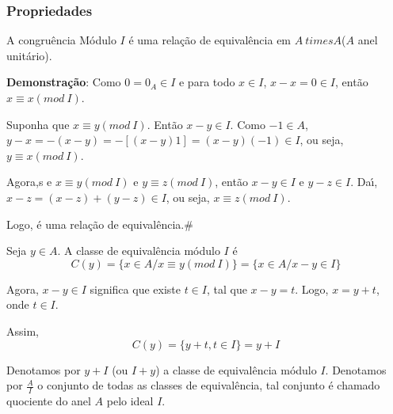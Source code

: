 \subsubsection{Propriedades}
\begin{proposicao} A congru{\^e}ncia M{\'o}dulo $I$ {\'e} uma rela{\c c}{\~a}o de equival{\^e}ncia em $A \ times A$($A$ anel unit{\'a}rio).\end{proposicao}

\textbf{Demonstra{\c c}{\~a}o}: Como $0=0_{A}\in I$ e para todo $x\in I$, $x-x=0\in I$, ent{\~a}o $x\equiv x(mod\ I)$.

Suponha que $x\equiv y(mod\ I)$. Ent{\~a}o $x-y\in I$. Como $-1\in A$,$y-x=-(x-y)=-[(x-y)1]=(x-y)(-1)\in I$, ou seja, $y\equiv x(mod\ I)$.

Agora,s e $x\equiv y(mod\ I)$ e $y\equiv z(mod\ I)$, ent{\~a}o $x-y\in I$ e $y-z\in I$. Da{\'\i}, $x-z=(x-z)+(y-z)\in I$, ou seja, $x\equiv z(mod\ I)$.

Logo, {\'e} uma rela{\c c}{\~a}o de equival{\^e}ncia.\#

Seja $y\in A$. A classe de equival{\^e}ncia m{\'o}dulo $I$ {\'e}
\[C(y)=\{x\in A/x\equiv y(mod\ I)\}=\{x\in A/x-y\in I\}\]


Agora, $x-y\in I$ significa que existe $t\in I$, tal que $x-y=t$. Logo, $x=y+t$, onde $t\in I$.

Assim,
\[C(y)=\{y+t,t\in I\}=y+I\]

\begin{nota} Denotamos por $y+I$ (ou $I+y$) a classe de equival{\^e}ncia m{\'o}dulo $I$. Denotamos por $\displaystyle\frac{A}{I}$ o conjunto de todas as classes de equival{\^e}ncia, tal conjunto {\'e} chamado quociente do anel $A$ pelo ideal $I$.\end{nota}

